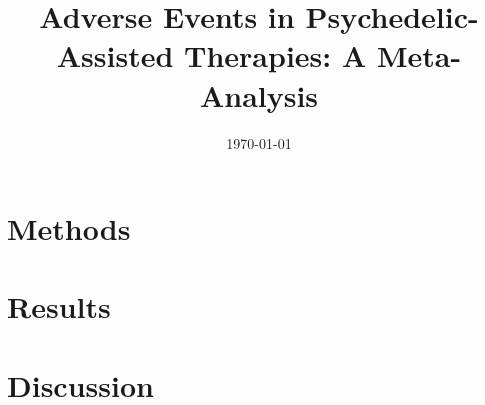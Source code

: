 \documentclass[11pt,a4paper]{article}
\title{Adverse Events in Psychedelic-Assisted Therapies: A Meta-Analysis}
\author{}
\date{\today}
\begin{document}
\maketitle

\begin{abstract}
\end{abstract}

\section{Methods}


\section{Results}


\section{Discussion}
\end{document}
